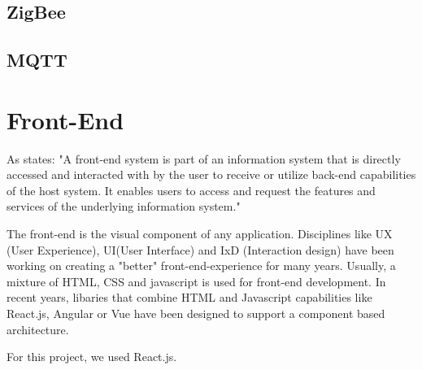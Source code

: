 \subsection{ZigBee}
\subsection{MQTT}

\section{Front-End}
As \parencite{frontend} states:
"A front-end system is part of an information system that is directly accessed and interacted with by the user to receive or 
utilize back-end capabilities of the host system. 
It enables users to access and request the features and services of the underlying information system."  

The front-end is the visual component of any application. Disciplines like UX (User Experience), UI(User Interface) and  IxD (Interaction design) have been working on creating 
a "better" front-end-experience for many years. Usually, a mixture of HTML, CSS and javascript is used for front-end development. 
In recent years, libaries that combine HTML and Javascript capabilities like React.js, Angular or Vue %
have been designed to support a component based architecture. 

For this project, we used React.js.

